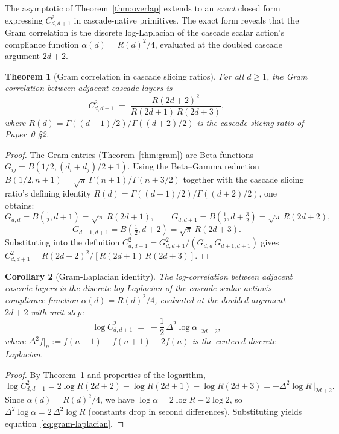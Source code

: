 \documentclass[12pt,a4paper]{article}
\newtheorem{theorem}{Theorem}[section]
\newtheorem{corollary}[theorem]{Corollary}
\theoremstyle{remark}
\begin{document}
The asymptotic of Theorem~\ref{thm:overlap} extends to an \emph{exact} closed form expressing $C^2_{d,d+1}$ in cascade-native primitives. The exact form reveals that the Gram correlation is the discrete log-Laplacian of the cascade scalar action's compliance function $\alpha(d) = R(d)^2/4$, evaluated at the doubled cascade argument $2d+2$.

\begin{theorem}[Gram correlation in cascade slicing ratios]\label{thm:gram-R}
For all $d \geq 1$, the Gram correlation between adjacent cascade layers is
\begin{equation}\label{eq:gram-R-form}
C^2_{d,d+1} \;=\; \frac{R(2d+2)^2}{R(2d+1)\,R(2d+3)},
\end{equation}
where $R(d) = \Gamma((d+1)/2)/\Gamma((d+2)/2)$ is the cascade slicing ratio of Paper~0 \S2.
\end{theorem}

\begin{proof}
The Gram entries (Theorem~\ref{thm:gram}) are Beta functions $G_{ij} = B(1/2, (d_i+d_j)/2 + 1)$. Using the Beta--Gamma reduction $B(1/2, n+1) = \sqrt{\pi}\,\Gamma(n+1)/\Gamma(n+3/2)$ together with the cascade slicing ratio's defining identity $R(d) = \Gamma((d+1)/2)/\Gamma((d+2)/2)$, one obtains:
\[
G_{d,d}     = B(\tfrac{1}{2}, d+1)   = \sqrt{\pi}\,R(2d+1), \qquad
G_{d,d+1}   = B(\tfrac{1}{2}, d+\tfrac{3}{2}) = \sqrt{\pi}\,R(2d+2),
\]
\[
G_{d+1,d+1} = B(\tfrac{1}{2}, d+2)   = \sqrt{\pi}\,R(2d+3).
\]
Substituting into the definition $C^2_{d,d+1} = G_{d,d+1}^2 / (G_{d,d}\,G_{d+1,d+1})$ gives
$C^2_{d,d+1} = R(2d+2)^2 / [R(2d+1)\,R(2d+3)]$.
\end{proof}

\begin{corollary}[Gram-Laplacian identity]\label{cor:gram-laplacian}
The log-correlation between adjacent cascade layers is the discrete log-Laplacian of the cascade scalar action's compliance function $\alpha(d) = R(d)^2/4$, evaluated at the doubled argument $2d+2$ with unit step:
\begin{equation}\label{eq:gram-laplacian}
\log C^2_{d,d+1} \;=\; -\frac{1}{2}\,\Delta^2 \log\alpha\,\Big|_{2d+2},
\end{equation}
where $\Delta^2 f|_n := f(n-1) + f(n+1) - 2f(n)$ is the centered discrete Laplacian.
\end{corollary}

\begin{proof}
By Theorem~\ref{thm:gram-R} and properties of the logarithm,
\[
\log C^2_{d,d+1} = 2\log R(2d+2) - \log R(2d+1) - \log R(2d+3) = -\Delta^2 \log R\,\big|_{2d+2}.
\]
Since $\alpha(d) = R(d)^2/4$, we have $\log\alpha = 2\log R - 2\log 2$, so $\Delta^2 \log\alpha = 2\,\Delta^2 \log R$ (constants drop in second differences). Substituting yields equation~\eqref{eq:gram-laplacian}.
\end{proof}
\end{document}
